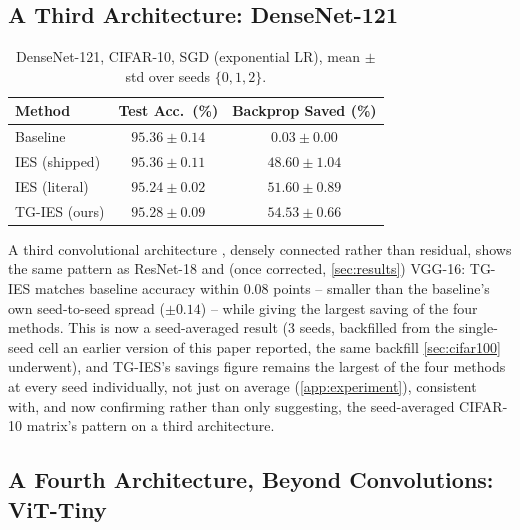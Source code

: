 \documentclass{article}
\newcommand{\win}[1]{\cellcolor{tgwin}#1}
\newcommand{\lose}[1]{\cellcolor{tglose}#1}
\theoremstyle{plain}
\theoremstyle{definition}
\theoremstyle{remark}
\begin{document}
\subsection{A Third Architecture: DenseNet-121}
\label{sec:densenet}

\begin{table}[h]
\caption{DenseNet-121, CIFAR-10, SGD (exponential LR), mean $\pm$ std over seeds $\{0,1,2\}$.}
\label{tab:densenet}
\vskip 0.1in
\begin{center}
\begin{small}
\begin{tabular}{lcc}
\toprule
Method & Test Acc.\ (\%) & Backprop Saved (\%) \\
\midrule
Baseline & $95.36\pm0.14$ & $0.03\pm0.00$ \\
IES (shipped) & $95.36\pm0.11$ & $48.60\pm1.04$ \\
IES (literal) & $95.24\pm0.02$ & $51.60\pm0.89$ \\
\win{TG-IES (ours)} & \lose{$95.28\pm0.09$} & \win{$\mathbf{54.53\pm0.66}$} \\
\bottomrule
\end{tabular}
\end{small}
\end{center}
\vskip -0.1in
\end{table}

A third convolutional architecture \citep{huang2017densely}, densely connected rather than residual, shows the same pattern as ResNet-18 and (once corrected, \cref{sec:results}) VGG-16: TG-IES matches baseline accuracy within $0.08$ points -- smaller than the baseline's own seed-to-seed spread ($\pm0.14$) -- while giving the largest saving of the four methods. This is now a seed-averaged result (3 seeds, backfilled from the single-seed cell an earlier version of this paper reported, the same backfill \cref{sec:cifar100} underwent), and TG-IES's savings figure remains the largest of the four methods at every seed individually, not just on average (\cref{app:experiment}), consistent with, and now confirming rather than only suggesting, the seed-averaged CIFAR-10 matrix's pattern on a third architecture.

\subsection{A Fourth Architecture, Beyond Convolutions: ViT-Tiny}
\label{sec:vit}
\end{document}
